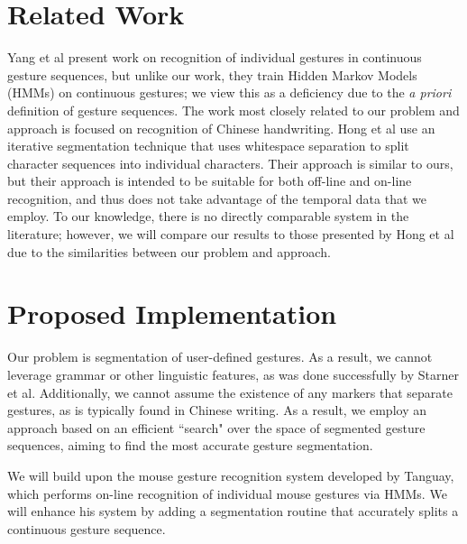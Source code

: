 \documentclass[twoside]{article}
\begin{document}
\begin{multicols}{2}
\section{Related Work}

Yang et al \cite{yang_gesture_1994} present work on recognition of individual
gestures in continuous gesture sequences, but unlike our work, they train Hidden
Markov Models (HMMs) on continuous gestures; we view this as a deficiency due to
the \emph{a priori} definition of gesture sequences. The work most closely
related to our problem and approach is focused on recognition of Chinese
handwriting\cite{hong1998segmentation}. Hong et al use an iterative segmentation
technique that uses whitespace separation to split character sequences into
individual characters. Their approach is similar to ours, but their approach is
intended to be suitable for both off-line and on-line recognition, and
thus does not take advantage of the temporal data that we employ. To our
knowledge, there is no directly comparable system in the literature; however, we
will compare our results to those presented by Hong et
al\cite{hong1998segmentation} due to the similarities between our problem and
approach.

\section{Proposed Implementation}

Our problem is segmentation of user-defined gestures. As a result, we
cannot leverage grammar or other linguistic features, as was done successfully
by Starner et al\cite{starner1994line}. Additionally, we cannot
assume the existence of any markers that separate gestures, as is typically found in Chinese
writing\cite{hong1998segmentation}. As a result, we employ an approach based on
an efficient ``search" over the space of segmented gesture sequences, aiming to
find the most accurate gesture segmentation.

We will build upon the mouse gesture recognition system developed by
Tanguay\cite{tanguay_jr_hidden_1995}, which performs on-line recognition of
individual mouse gestures via HMMs. We will enhance his system by adding a segmentation
routine that accurately splits a continuous gesture sequence.


\end{multicols}
\end{document}
